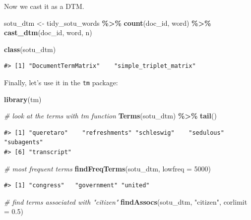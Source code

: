 \documentclass[
]{book}
\newenvironment{Shaded}{\begin{snugshade}}{\end{snugshade}}
\newcommand{\AttributeTok}[1]{\textcolor[rgb]{0.13,0.29,0.53}{#1}}
\newcommand{\CommentTok}[1]{\textcolor[rgb]{0.56,0.35,0.01}{\textit{#1}}}
\newcommand{\DecValTok}[1]{\textcolor[rgb]{0.00,0.00,0.81}{#1}}
\newcommand{\FloatTok}[1]{\textcolor[rgb]{0.00,0.00,0.81}{#1}}
\newcommand{\FunctionTok}[1]{\textcolor[rgb]{0.13,0.29,0.53}{\textbf{#1}}}
\newcommand{\NormalTok}[1]{#1}
\newcommand{\OtherTok}[1]{\textcolor[rgb]{0.56,0.35,0.01}{#1}}
\newcommand{\SpecialCharTok}[1]{\textcolor[rgb]{0.81,0.36,0.00}{\textbf{#1}}}
\newcommand{\StringTok}[1]{\textcolor[rgb]{0.31,0.60,0.02}{#1}}
\begin{document}
Now we cast it as a DTM.

\begin{Shaded}
\begin{Highlighting}[]
\NormalTok{sotu\_dtm }\OtherTok{\textless{}{-}}\NormalTok{ tidy\_sotu\_words }\SpecialCharTok{\%\textgreater{}\%} 
  \FunctionTok{count}\NormalTok{(doc\_id, word) }\SpecialCharTok{\%\textgreater{}\%} 
  \FunctionTok{cast\_dtm}\NormalTok{(doc\_id, word, n) }

\FunctionTok{class}\NormalTok{(sotu\_dtm)}
\end{Highlighting}
\end{Shaded}

\begin{verbatim}
#> [1] "DocumentTermMatrix"    "simple_triplet_matrix"
\end{verbatim}

Finally, let's use it in the \texttt{tm} package:

\begin{Shaded}
\begin{Highlighting}[]
\FunctionTok{library}\NormalTok{(tm)}

\CommentTok{\# look at the terms with tm function}
\FunctionTok{Terms}\NormalTok{(sotu\_dtm) }\SpecialCharTok{\%\textgreater{}\%} \FunctionTok{tail}\NormalTok{()}
\end{Highlighting}
\end{Shaded}

\begin{verbatim}
#> [1] "queretaro"    "refreshments" "schleswig"    "sedulous"     "subagents"   
#> [6] "transcript"
\end{verbatim}

\begin{Shaded}
\begin{Highlighting}[]
\CommentTok{\# most frequent terms}
\FunctionTok{findFreqTerms}\NormalTok{(sotu\_dtm, }\AttributeTok{lowfreq =} \DecValTok{5000}\NormalTok{)}
\end{Highlighting}
\end{Shaded}

\begin{verbatim}
#> [1] "congress"   "government" "united"
\end{verbatim}

\begin{Shaded}
\begin{Highlighting}[]
\CommentTok{\# find terms associated with "citizen"}
\FunctionTok{findAssocs}\NormalTok{(sotu\_dtm, }\StringTok{"citizen"}\NormalTok{, }\AttributeTok{corlimit =} \FloatTok{0.5}\NormalTok{)}
\end{Highlighting}
\end{Shaded}
\end{document}
